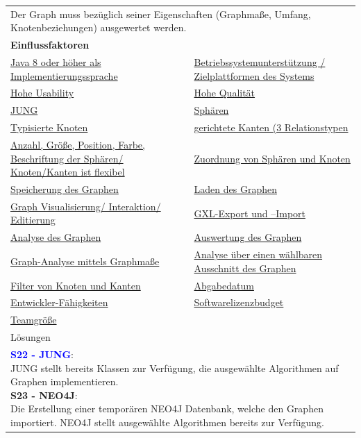 \documentclass[enabledeprecatedfontcommands,fontsize=11pt,paper=a4,twoside]{scrartcl}
\newcommand{\cb}[1]{{\textcolor{blue}{#1}}}
\begin{document}
	\begin{tabular} {|p{8cm} p{8cm}|}
		\hline
		\rowcolor{prob}\multicolumn{2}{|l|}{\parbox{16cm}{\textbf{08: Auswertung von Grapheigenschaften}}} \\  \hline\hline 
		\multicolumn{2}{|l|}{\parbox{16cm}{Der Graph muss bezüglich seiner Eigenschaften (Graphmaße, Umfang, Knotenbeziehungen) ausgewertet werden.}}\rule{0pt}{4ex}\\ [1ex] \hline
		\multicolumn{2}{|l|}{\textbf{Einflussfaktoren}}\\
		\hyperlink{b}{Java 8 oder höher als Implementierungssprache} &
		\hyperlink {f}{Betriebssystemunterstützung / Zielplattformen des Systems}\\
		\hyperlink {g}{Hohe Usability}&
		\hyperlink {h}{Hohe Qualität}\\
		\hyperlink {k}{JUNG} &
		\hyperlink {n}{Sphären} \\
		\hyperlink {p}{Typisierte Knoten} &
		\hyperlink {q}{gerichtete Kanten (3 Relationstypen}\\
		\hyperlink {r}{Anzahl, Größe, Position, Farbe, Beschriftung der Sphären/ Knoten/Kanten ist flexibel} &
		\hyperlink {t}{Zuordnung von Sphären und Knoten} \\
		\hyperlink {v}{Speicherung des Graphen} &
		\hyperlink {w}{Laden des Graphen} \\
		\hyperlink {aa}{Graph Visualisierung/ Interaktion/ Editierung}&
		\hyperlink {jj}{GXL-Export und –Import} \\
		\hyperlink {oo}{Analyse des Graphen} &
		\hyperlink {pp}{Auswertung des Graphen} \\
		\hyperlink {qq}{Graph-Analyse mittels Graphmaße} &
		\hyperlink {rr}{Analyse über einen wählbaren Ausschnitt des Graphen} \\ 
		\hyperlink {ss}{Filter von Knoten und Kanten} &
		\hyperlink {uu}{Abgabedatum} \\
		\hyperlink {vv}{Entwickler-Fähigkeiten} &
		\hyperlink {ww}{Softwarelizenzbudget} \\
		\hyperlink {xx}{Teamgröße} &
		\\ \hline
		\multicolumn{2}{|l|}{Lösungen} \\
		\multicolumn{2}{|l|}{\parbox{16cm}{
				\textbf{\cb{\hypertarget{fff}{S22 - JUNG}}}: \\
				JUNG stellt bereits Klassen zur Verfügung, die ausgewählte Algorithmen auf Graphen implementieren. \\
				\textbf{S23 - NEO4J}: \\
				Die Erstellung einer temporären NEO4J Datenbank, welche den Graphen importiert. NEO4J stellt ausgewählte Algorithmen bereits zur Verfügung. \\
}}
\end{tabular}
\end{document}
